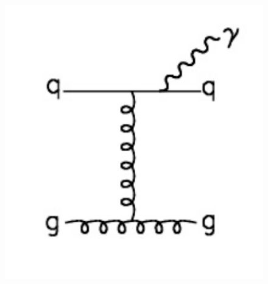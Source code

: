 \documentclass[12pt,twoside,letterpaper,doublespace]{article}
\begin{document}
\begin{figure}[b!]
{\includegraphics[scale=0.35]{p1j_brem.pdf}
}
\qquad\qquad
{}
\end{figure}
\end{document}
